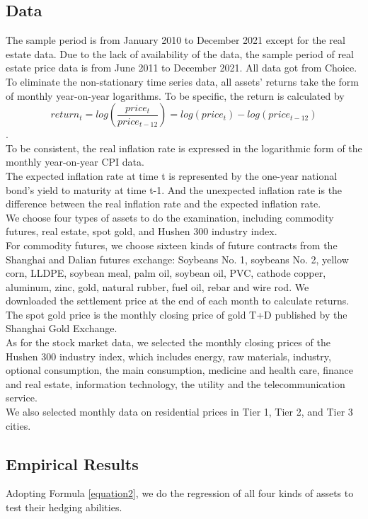 \documentclass[12pt]{article}
\begin{document}
\subsection{Data}
The sample period is from January 2010 to December 2021 except for the real estate data. Due to the lack of availability of the data, the sample period of real estate price data is from June 2011 to December 2021. All data got from Choice.\\
To eliminate the non-stationary time series data, all assets' returns take the form of monthly year-on-year logarithms. To be specific, the return is calculated by$$return_{t}=log(\frac{price_{t}}{price_{t-12}})=log(price_{t})-log(price_{t-12})$$. \\
To be consistent, the real inflation rate is expressed in the logarithmic form of the monthly year-on-year CPI data.\\
The expected inflation rate at time t is represented by the one-year national bond's yield to maturity at time t-1. And the unexpected inflation rate is the difference between the real inflation rate and the expected inflation rate.\\
We choose four types of assets to do the examination, including commodity futures, real estate, spot gold, and Hushen 300 industry index.\\
For commodity futures, we choose sixteen kinds of future contracts from the Shanghai and Dalian futures exchange: Soybeans No. 1, soybeans No. 2, yellow corn, LLDPE, soybean meal, palm oil, soybean oil, PVC, cathode copper, aluminum, zinc, gold, natural rubber, fuel oil, rebar and wire rod. We downloaded the settlement price at the end of each month to calculate returns.\\
The spot gold price is the monthly closing price of gold T+D published by the Shanghai Gold Exchange.\\
As for the stock market data, we selected the monthly closing prices of the Hushen 300 industry index, which includes energy, raw materials, industry, optional consumption, the main consumption, medicine and health care, finance and real estate, information technology, the utility and the telecommunication service.\\
We also selected monthly data on residential prices in Tier 1, Tier 2, and Tier 3 cities.\\
\subsection{Empirical Results}
Adopting Formula \eqref{equation2}, we do the regression of all four kinds of assets to test their hedging abilities.\\
\end{document}
